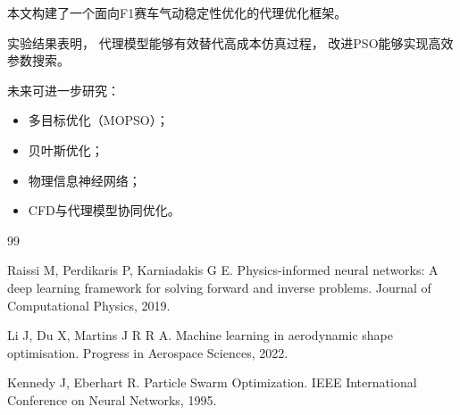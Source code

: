 \documentclass[UTF8,12pt,a4paper]{ctexart}
\begin{document}
本文构建了一个面向F1赛车气动稳定性优化的代理优化框架。

实验结果表明，
代理模型能够有效替代高成本仿真过程，
改进PSO能够实现高效参数搜索。

未来可进一步研究：

\begin{itemize}
    \item 多目标优化（MOPSO）；
    \item 贝叶斯优化；
    \item 物理信息神经网络；
    \item CFD与代理模型协同优化。
\end{itemize}


\begin{thebibliography}{99}

Raissi M, Perdikaris P, Karniadakis G E.
Physics-informed neural networks:
A deep learning framework for solving forward and inverse problems.
Journal of Computational Physics, 2019.

Li J, Du X, Martins J R R A.
Machine learning in aerodynamic shape optimisation.
Progress in Aerospace Sciences, 2022.

Kennedy J, Eberhart R.
Particle Swarm Optimization.
IEEE International Conference on Neural Networks, 1995.

\end{thebibliography}
\end{document}
